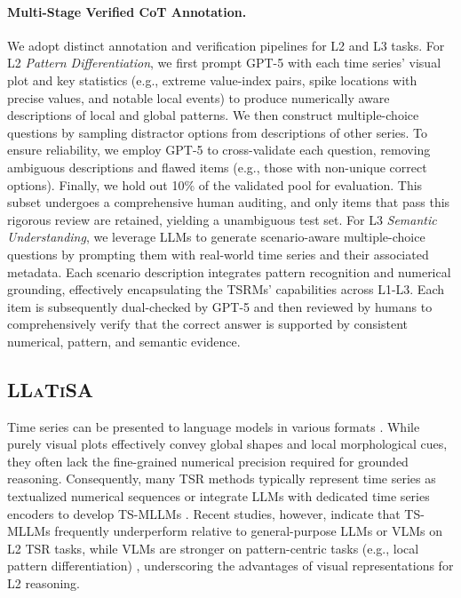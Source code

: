 \documentclass[11pt]{article}
\begin{document}
\paragraph{Multi-Stage Verified CoT Annotation.}
We adopt distinct annotation and verification pipelines for L2 and L3 tasks. For L2 \emph{Pattern Differentiation}, we first prompt GPT-5 with each time series’ visual plot and key statistics (e.g., extreme value-index pairs, spike locations with precise values, and notable local events) to produce numerically aware descriptions of local and global patterns. We then construct multiple-choice questions by sampling distractor options from descriptions of other series. 
To ensure reliability, we employ GPT-5 to cross-validate each question, removing ambiguous descriptions and flawed items (e.g., those with non-unique correct options). 
Finally, we hold out 10\% of the validated pool for evaluation. This subset undergoes a comprehensive human auditing, and only items that pass this rigorous review are retained, yielding a unambiguous test set. 
For L3 \emph{Semantic Understanding}, we leverage LLMs to generate scenario-aware multiple-choice questions by prompting them with real-world time series and their associated metadata. Each scenario description integrates pattern recognition and numerical grounding, effectively encapsulating the TSRMs' capabilities across L1-L3. 
Each item is subsequently dual-checked by GPT-5 and then reviewed by humans to comprehensively verify that the correct answer is supported by consistent numerical, pattern, and semantic evidence.

\subsection{\textsc{LLaTiSA}}
Time series can be presented to language models in various formats \cite{bedtime}. While purely visual plots effectively convey global shapes and local morphological cues, they often lack the fine-grained numerical precision required for grounded reasoning. Consequently, many TSR methods typically represent time series as textualized numerical sequences \cite{timeomni,timemqa} or integrate LLMs with dedicated time series encoders to develop TS-MLLMs \cite{chatts,timesense}. Recent studies, however, indicate that TS-MLLMs frequently underperform relative to general-purpose LLMs or VLMs on L2 TSR tasks, while VLMs are stronger on pattern-centric tasks (e.g., local pattern differentiation) \cite{bedtime}, underscoring the advantages of visual representations for L2 reasoning. 
\end{document}
